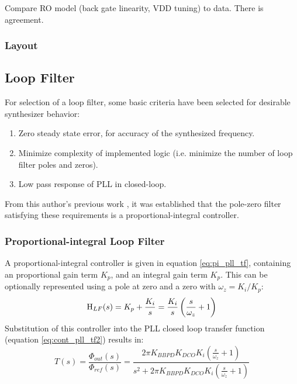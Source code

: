 	 Compare RO model (back gate linearity, VDD tuning) to data. There is agreement.
		\subsubsection{Layout}








	\pagebreak\FloatBarrier
	\subsection{Loop Filter}
	For selection of a loop filter, some basic criteria have been selected for desirable synthesizer behavior:
	\begin{enumerate}[itemsep=0pt,label=\protect\mycirc{\arabic*}]
		\setlength\itemsep{-0.8em}
		\item Zero steady state error, for accuracy of the synthesized frequency.
		\item Minimize complexity of implemented logic (i.e. minimize the number of loop filter poles and zeros).
		\item Low pass response of PLL in closed-loop.
	\end{enumerate}
	From this author's previous work \cite{Me}, it was established that the pole-zero filter satisfying these requirements is a proportional-integral controller.

\subsubsection{Proportional-integral Loop Filter}
 A proportional-integral controller \cite{ogata_2010_pid} is given in equation \ref{eq:pi_pll_tf}, containing an proportional gain term $K_p$, and an integral gain term $K_p$. This can be optionally represented using a pole at zero and a zero with $\omega_z = K_i/K_p$:
			\begin{equation} \label{eq:pi_pll_tf}
				\textnormal{H}_{LF}(s) = K_p + \frac{K_i}{s}  = \frac{K_i}{s}\left(\frac{s}{\omega_z} + 1\right) 
			\end{equation}
			Substitution of this controller into the PLL closed loop transfer function (equation \ref{eq:cont_pll_tf2}) results in:
			\begin{equation}\label{eq:pi_bbpdpll_tf}
				T(s) = \frac{\Phi_{out}(s)}{\Phi_{ref}(s)} =  \frac{ 2\pi K_{BBPD}K_{DCO}K_{i} \left(\frac{s}{\omega_z} + 1\right) }{s^2 + 2\pi K_{BBPD}K_{DCO}K_{i}\left(\frac{s}{\omega_z} + 1\right) }
			\end{equation}

